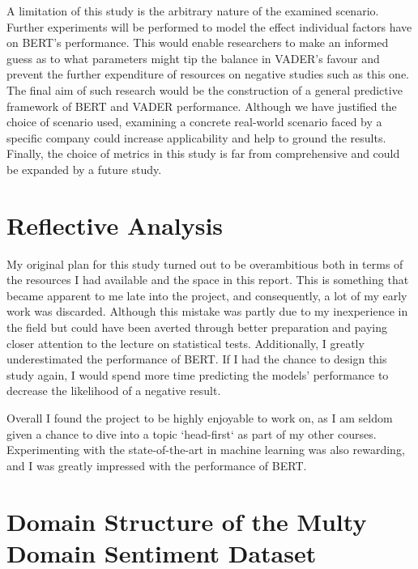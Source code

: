 \documentclass{csfourzero}
\begin{document}
\par
A limitation of this study is the arbitrary nature of the examined scenario. Further experiments will be performed to model the effect individual factors have on BERT's performance. This would enable researchers to make an informed guess as to what parameters might tip the balance in VADER's favour and prevent the further expenditure of resources on negative studies such as this one. The final aim of such research would be the construction of a general predictive framework of BERT and VADER performance. Although we have justified the choice of scenario used, examining a concrete real-world scenario faced by a specific company could increase applicability and help to ground the results. Finally, the choice of metrics in this study is far from comprehensive and could be expanded by a future study.


\section{Reflective Analysis}

My original plan for this study turned out to be overambitious both in terms of the resources I had available and the space in this report. This is something that became apparent to me late into the project, and consequently, a lot of my early work was discarded. Although this mistake was partly due to my inexperience in the field but could have been averted through better preparation and paying closer attention to the lecture on statistical tests. Additionally, I greatly underestimated the performance of BERT. If I had the chance to design this study again, I would spend more time predicting the models' performance to decrease the likelihood of a negative result.
\par
Overall I found the project to be highly enjoyable to work on, as I am seldom given a chance to dive into a topic `head-first` as part of my other courses. Experimenting with the state-of-the-art in machine learning was also rewarding, and I was greatly impressed with the performance of BERT.



\newpage

\appendix

\section{Domain Structure of the Multy Domain Sentiment Dataset}
\label{appendix:A}
\end{document}
